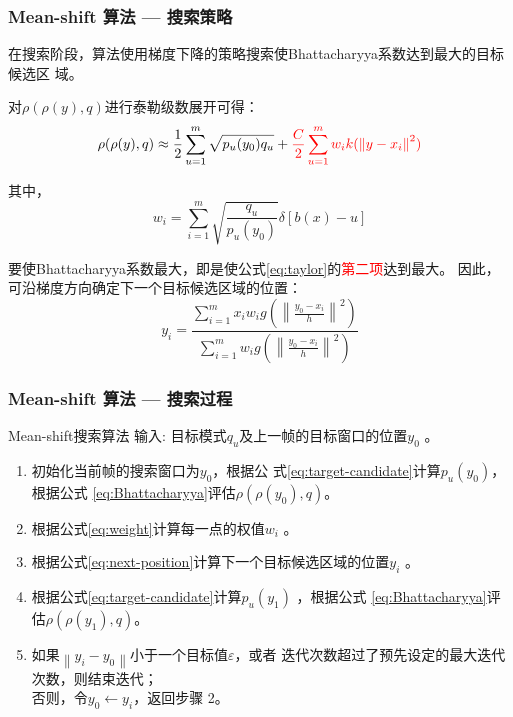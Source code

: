 \documentclass[xcolor=svgnames,serif,table,10pt]{beamer}
\begin{document}
\begin{frame}
  \frametitle{Mean-shift 算法 --- 搜索策略}
  \small
  在搜索阶段，算法使用梯度下降的策略搜索使Bhattacharyya系数达到最大的目标候选区
  域。
  
    对$\rho(\rho(y),q)$进行泰勒级数展开可得：
\begin{equation}
  \label{eq:taylor}
  \rho(\rho(y),q)\approx \frac{1}{2}\sum_{u=1}^{m}\sqrt{p_u(y_0)q_u}+\textcolor{red}{\frac{C}{2}\sum_{u=1}^{m}w_{i}k(\left\|y-x_i\right\|^2)}
\end{equation}

其中，
\begin{equation}
    \label{eq:weight}
    w_{i}=\sum_{i=1}^{m}\sqrt{\frac{q_u}{p_{u}(y_0)}}\delta[b(x)-u]
\end{equation}

要使Bhattacharyya系数最大，即是使公式\ref{eq:taylor}的\textcolor{red}{第二项}达到最大。
因此，可沿梯度方向确定下一个目标候选区域的位置：
    \begin{equation}
    \label{eq:next-position}
    y_{i}=\frac{\sum_{i=1}^{m}x_{i}w_{i}g\left(\left\|\frac{y_0-x_i}{h}\right\|^{2}\right)}{\sum_{i=1}^{m}w_{i}g\left(\left\|\frac{y_0-x_i}{h}\right\|^{2}\right)}
  \end{equation}
\end{frame}

\begin{frame}
  \frametitle{Mean-shift 算法 --- 搜索过程}
  \begin{exampleblock}{Mean-shift搜索算法}
    \textcolor{black!60!green}{输入}: 目标模式$q_u$及上一帧的目标窗口的位置$y_0$ 。\vspace{-.5em}
    \begin{enumerate}[(S1)]
    \item 初始化当前帧的搜索窗口为$y_0$，根据公
    式\ref{eq:target-candidate}计算$p_u(y_0)$，根据公式
   \ref{eq:Bhattacharyya}评估$\rho(\rho(y_0),q)$。
    \item 根据公式\ref{eq:weight}计算每一点的权值$w_{i}$ 。
    \item 根据公式\ref{eq:next-position}计算下一个目标候选区域的位置$y_{i}$
   。
    \item 根据公式\ref{eq:target-candidate}计算$p_u(y_1)$ ，根据公式
   \ref{eq:Bhattacharyya}评估$\rho(\rho(y_1),q)$。
    \item 如果$\left\|y_{i}-y_{0}\right\|$小于一个目标值$\varepsilon$，或者
    迭代次数超过了预先设定的最大迭代次数，则结束迭代；\\
    否则，令$y_{0}\leftarrow y_{i}$，返回步骤 2。
    \end{enumerate}
  \end{exampleblock}
\end{frame}
\end{document}
